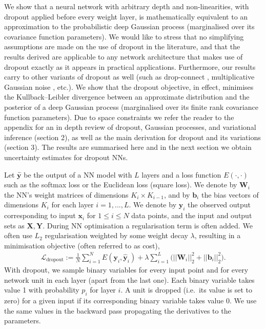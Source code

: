 \documentclass{article}
\newcommand{\cL}{\mathcal{L}}
\newcommand{\x}{\mathbf{x}}
\newcommand{\Bb}{\mathbf{b}}
\newcommand{\y}{\mathbf{y}}
\newcommand{\W}{\mathbf{W}}
\newcommand{\X}{\mathbf{X}}
\newcommand{\Y}{\mathbf{Y}}
\newcommand{\weightdecay}{\lambda}
\theoremstyle{definition}
\begin{document}
We show that a neural network with arbitrary depth and non-linearities, with dropout applied before every weight layer, is mathematically equivalent to an approximation to the probabilistic deep Gaussian process \citep{damianou2013deep} (marginalised over its covariance function parameters). We would like to stress that no simplifying assumptions are made on the use of dropout in the literature, and that the results derived are applicable to any network architecture that makes use of dropout exactly as it appears in practical applications. 
Furthermore, our results carry to other variants of dropout as well (such as drop-connect \citep{wan2013regularization}, multiplicative Gaussian noise \citep{srivastava2014dropout}, etc.).
We show that the dropout objective, in effect, minimises the Kullback--Leibler divergence between an approximate distribution and the posterior of a deep Gaussian process (marginalised over its finite rank covariance function parameters). 
Due to space constraints we refer the reader to the appendix for an in depth review of dropout, Gaussian processes, and variational inference (section 2), as well as the main derivation for dropout and its variations (section 3). The results are summarised here and in the next section we obtain uncertainty estimates for dropout NNs.

Let $\widehat{\y}$ be the output of a NN model with $L$ layers and a loss function $E(\cdot,\cdot)$ such as the softmax loss or the Euclidean loss (square loss). We denote by $\W_i$ the NN's weight matrices of dimensions $K_i \times K_{i-1}$, and by $\Bb_i$ the bias vectors of dimensions $K_i$ for each layer $i = 1, ..., L$. We denote by $\y_i$ the observed output corresponding to input $\x_i$ for $1 \leq i \leq N$ data points, and the input and output sets as $\X, \Y$.
During NN optimisation a regularisation term is often added.
We often use $L_2$ regularisation weighted by some weight decay $\weightdecay$, resulting in a minimisation objective (often referred to as cost),
\begin{align} \label{eq:L:dropout}
\cL_{\text{dropout}} := \frac{1}{N} \sum_{i=1}^N E(\y_i,\widehat{\y}_i) + \weightdecay \sum_{i=1}^L \big( ||\W_i||^2_2 + ||\Bb_i||^2_2 \big).
\end{align}
With dropout, we sample binary variables for every input point and for every network unit in each layer (apart from the last one). Each binary variable takes value 1 with probability $p_i$ for layer $i$. A unit is dropped (i.e.\ its value is set to zero) for a given input if its corresponding binary variable takes value 0. We use the same values in the backward pass propagating the derivatives to the parameters.
\end{document}
